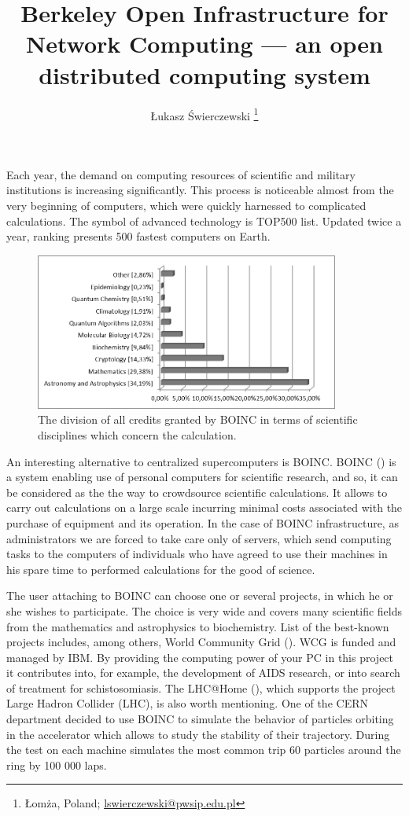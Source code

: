 \documentclass[10pt, a5paper]{article}
\begin{document}
\title{Berkeley Open Infrastructure for Network Computing — an open distributed computing system}
\author{Łukasz Świerczewski \footnote{Łomża, Poland; \url{lswierczewski@pwsip.edu.pl}}}
\maketitle
Each year, the demand on computing resources of scientific and military institutions is increasing significantly. This process is noticeable almost from the very beginning of computers, which were quickly harnessed to complicated calculations. The symbol of advanced technology is TOP500 list. Updated twice a year, ranking presents 500 fastest computers on Earth.

\begin{figure}[h!]
  \centering
  \includegraphics[width=10cm]{104_2013_w_Swierczewski_boinc_1}
  \caption{The division of all credits granted by BOINC in terms of scientific disciplines which concern the calculation.}\label{fig:swier1}
\end{figure}

An interesting alternative to centralized supercomputers is BOINC. BOINC (\cite{swier1}) is a system enabling use of personal computers for scientific research, and so, it can be considered as the the way to crowdsource scientific calculations. It allows to carry out calculations on a large scale incurring minimal costs associated with the purchase of equipment and its operation. In the case of BOINC infrastructure, as administrators we are forced to take care only of servers, which send computing tasks to the computers of individuals who have agreed to use their machines in his spare time to performed calculations for the good of science.

The user attaching to BOINC can choose one or several projects, in which he or she wishes to participate. The choice is very wide and covers many scientific fields from the mathematics and astrophysics to biochemistry. List of the best-known projects includes, among others, World Community Grid (\cite{swier2}). WCG is funded and managed by IBM. By providing the computing power of your PC in this project it contributes into, for example, the development of AIDS research, or into search of treatment for schistosomiasis. The LHC@Home (\cite{swier3}), which supports the project Large Hadron Collider (LHC), is also worth mentioning. One of the CERN department  decided to use BOINC to simulate the behavior of particles orbiting in the accelerator which allows to study the stability of their trajectory. During the test on each machine simulates the most common trip 60 particles around the ring by 100 000 laps.
\end{document}
